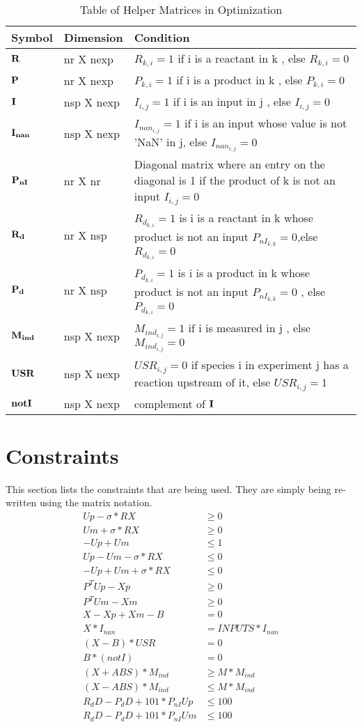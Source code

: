 \documentclass[
10pt, %
letter, %
oneside, %
BCOR02mm, %
]{scrartcl}
\begin{document}
\begin{table}
\caption{Table of Helper Matrices in Optimization}
\label{obj_help}
\begin{tabular}{l|l|p{10cm} }
\hline
Symbol& Dimension& Condition\\
\hline
$\bf{R}$ & nr X nexp &  $R_{k,i}=1$ if i is a reactant in k , else $R_{k,i}=0$\\
$\bf{P}$ & nr X nexp &   $P_{k,i}=1$ if i is a product in k , else $P_{k,i}=0$ \\
$\bf{I}$& nsp X nexp &    $I_{i,j}=1$ if i is an input in j  , else $I_{i,j}=0$\\
$\bf{I_{nan}}$& nsp X nexp &  $I_{nan_{i,j}}=1$ if i is an input whose value is not 'NaN' in j, else $I_{nan_{i,j}}=0$ \\
$\bf{P_{nI}}$& nr X nr  & Diagonal matrix where an entry on the diagonal is 1 if the product of k is not an input $I_{i,j}=0$ \\
$\bf{R_{d}}$& nr X nsp & $R_{d_{k,i}}=1$ is i is a reactant in k whose product is not an input $P_{nI_{k,k}}=0 $,else $R_{d_{k,i}}=0$   \\
$\bf{P_{d}}$& nr X nsp &  $P_{d_{k,i}}=1$ is i is a product in k whose product is not an input $P_{nI_{k,k}}=0 $ , else $P_{d_{k,i}}=0$  \\
$\bf{M_{ind}}$& nsp X nexp & $M_{ind_{i,j}}=1$ if i is measured in j  , else $M_{ind_{i,j}}=0$ \\
$\bf{USR}$& nsp X nexp & $USR_{i,j}=0$ if species i in experiment j has a reaction upstream of it, else $USR_{i,j}=1$  \\
$\bf{notI}$& nsp X nexp & complement of $\bf{I}$ \\
\hline
\end{tabular}
\end{table}

\section{Constraints}
This section lists the constraints that are being used. They are simply being re-written using the matrix notation. 
\begin{subequations}
\begin{align}
Up-\sigma*RX & \geq 0 \\
Um+\sigma*RX & \geq 0 \\
-Up+Um & \leq 1\\
Up-Um-\sigma*RX & \leq 0 \\
-Up+Um+\sigma*RX & \leq 0 \\
P^TUp-Xp & \geq 0\\
P^T Um-Xm & \geq 0\\
X-Xp+Xm-B & = 0 \\
X*I_{nan} & = INPUTS*I_{nan} \\
(X-B)*USR & = 0 \\
B*(notI) & =0 \\
(X+ABS)*M_{ind} & \geq M*M_{ind}\\
(X-ABS)*M_{ind} & \leq M*M_{ind}\\
R_dD-P_dD+101*P_{nI}Up &\leq 100 \\
R_dD-P_dD+101*P_{nI}Um &\leq 100 \\
\end{align}
\end{subequations}
\end{document}
